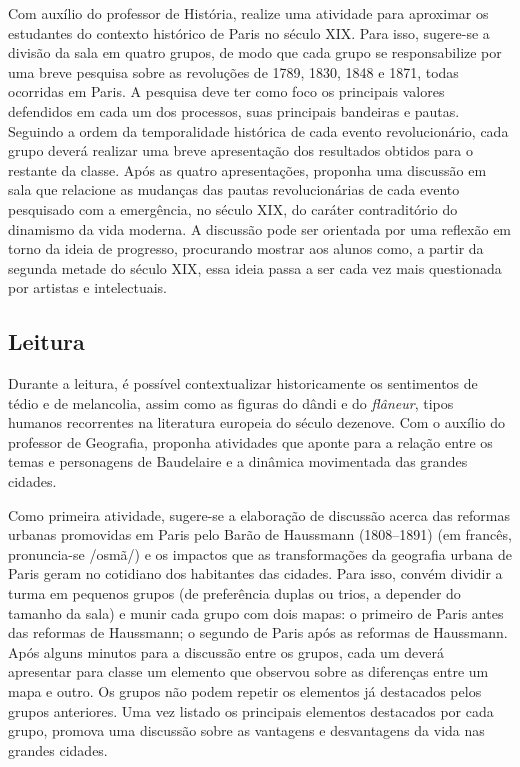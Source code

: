 \documentclass[12pt]{extarticle}
\begin{document}
Com auxílio do professor de História, realize uma atividade para aproximar os estudantes do contexto histórico de Paris no século XIX. Para isso, sugere-se a divisão da sala em quatro grupos, de modo que cada grupo se responsabilize por uma breve pesquisa sobre as revoluções de 1789, 1830, 1848 e 1871, todas ocorridas em Paris. A pesquisa deve ter como foco os principais valores defendidos em cada um dos processos, suas principais bandeiras e pautas. Seguindo a ordem da temporalidade histórica de cada evento revolucionário, cada grupo deverá realizar uma breve apresentação dos resultados obtidos para o restante da classe. Após as quatro apresentações, proponha uma discussão em sala que relacione as mudanças das pautas revolucionárias de cada evento pesquisado com a emergência, no século XIX, do caráter contraditório do dinamismo da vida moderna. A discussão pode ser orientada por uma reflexão em torno da ideia de progresso, procurando mostrar aos alunos como, a partir da segunda metade do século XIX, essa ideia passa a ser cada vez mais questionada por artistas e intelectuais.




\subsection{Leitura}

Durante a leitura, é possível contextualizar historicamente
os sentimentos de tédio e de melancolia, assim como as figuras do dândi
e do \textit{flâneur}, tipos humanos recorrentes na literatura europeia do
século dezenove. Com o auxílio do professor de Geografia, proponha atividades que aponte para a relação entre os temas e personagens de Baudelaire e a dinâmica movimentada das grandes cidades. 

Como primeira atividade, sugere-se a elaboração de discussão acerca das reformas urbanas promovidas em Paris pelo Barão de Haussmann (1808--1891)
(em francês, pronuncia-se /osmã/) e os impactos que as transformações da geografia urbana de Paris geram no cotidiano dos habitantes das cidades. Para isso, convém dividir a turma em pequenos grupos (de preferência duplas ou trios, a depender do tamanho da sala) e munir cada grupo com dois mapas: o primeiro de Paris antes das reformas de Haussmann; o segundo de Paris após as reformas de Haussmann. Após alguns minutos para a discussão entre os grupos, cada um deverá apresentar para classe um elemento que observou sobre as diferenças entre um mapa e outro. Os grupos não podem repetir os elementos já destacados pelos grupos anteriores. Uma vez listado os principais elementos destacados por cada grupo, promova uma discussão sobre as vantagens e desvantagens da vida nas grandes cidades.
\end{document}
